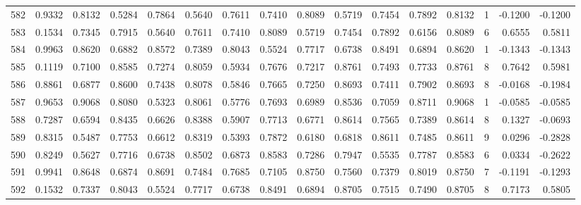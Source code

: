 \begin{tabular}{lrrrrrrrrrrrrrrr}
582 &      0.9332 &  0.8132 &  0.5284 &  0.7864 &  0.5640 &  0.7611 &  0.7410 &  0.8089 &  0.5719 &  0.7454 &   0.7892 &     0.8132 &      1 &                   -0.1200 &                    -0.1200 \\
583 &      0.1534 &  0.7345 &  0.7915 &  0.5640 &  0.7611 &  0.7410 &  0.8089 &  0.5719 &  0.7454 &  0.7892 &   0.6156 &     0.8089 &      6 &                    0.6555 &                     0.5811 \\
584 &      0.9963 &  0.8620 &  0.6882 &  0.8572 &  0.7389 &  0.8043 &  0.5524 &  0.7717 &  0.6738 &  0.8491 &   0.6894 &     0.8620 &      1 &                   -0.1343 &                    -0.1343 \\
585 &      0.1119 &  0.7100 &  0.8585 &  0.7274 &  0.8059 &  0.5934 &  0.7676 &  0.7217 &  0.8761 &  0.7493 &   0.7733 &     0.8761 &      8 &                    0.7642 &                     0.5981 \\
586 &      0.8861 &  0.6877 &  0.8600 &  0.7438 &  0.8078 &  0.5846 &  0.7665 &  0.7250 &  0.8693 &  0.7411 &   0.7902 &     0.8693 &      8 &                   -0.0168 &                    -0.1984 \\
587 &      0.9653 &  0.9068 &  0.8080 &  0.5323 &  0.8061 &  0.5776 &  0.7693 &  0.6989 &  0.8536 &  0.7059 &   0.8711 &     0.9068 &      1 &                   -0.0585 &                    -0.0585 \\
588 &      0.7287 &  0.6594 &  0.8435 &  0.6626 &  0.8388 &  0.5907 &  0.7713 &  0.6771 &  0.8614 &  0.7565 &   0.7389 &     0.8614 &      8 &                    0.1327 &                    -0.0693 \\
589 &      0.8315 &  0.5487 &  0.7753 &  0.6612 &  0.8319 &  0.5393 &  0.7872 &  0.6180 &  0.6818 &  0.8611 &   0.7485 &     0.8611 &      9 &                    0.0296 &                    -0.2828 \\
590 &      0.8249 &  0.5627 &  0.7716 &  0.6738 &  0.8502 &  0.6873 &  0.8583 &  0.7286 &  0.7947 &  0.5535 &   0.7787 &     0.8583 &      6 &                    0.0334 &                    -0.2622 \\
591 &      0.9941 &  0.8648 &  0.6874 &  0.8691 &  0.7484 &  0.7685 &  0.7105 &  0.8750 &  0.7560 &  0.7379 &   0.8019 &     0.8750 &      7 &                   -0.1191 &                    -0.1293 \\
592 &      0.1532 &  0.7337 &  0.8043 &  0.5524 &  0.7717 &  0.6738 &  0.8491 &  0.6894 &  0.8705 &  0.7515 &   0.7490 &     0.8705 &      8 &                    0.7173 &                     0.5805 \\

\end{tabular}
